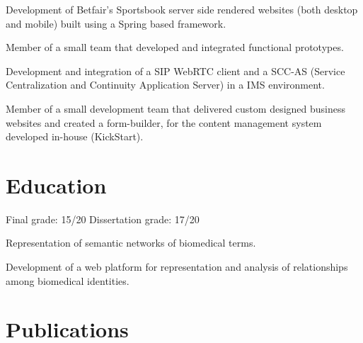 \documentclass[]{andre-vechina-resume}
\begin{document}
\vspace{\topsep} %
\begin{tightemize}
\item
Development of Betfair's Sportsbook server side rendered websites (both desktop and mobile) built using a Spring based framework.
\end{tightemize}
\sectionsep

\begin{tightemize}
\item
Member of a small team that developed and integrated functional prototypes.
\item
Development and integration of a SIP WebRTC client and a SCC-AS (Service Centralization and Continuity Application Server) in a IMS environment.
\end{tightemize}
\sectionsep

\begin{tightemize}
\item
Member of a small development team that delivered custom designed business websites and created a form-builder, for the content management system developed in-house (KickStart).
\end{tightemize}
\sectionsep

\section{Education}

Final grade: {\color{subheadings} 15/20}
\tdot
Dissertation grade: {\color{subheadings} 17/20}\\
\begin{tightemize}
\item
Representation of semantic networks of biomedical terms.
\item
Development of a web platform for representation and analysis of relationships among biomedical identities.
\end{tightemize}
\sectionsep

\section{Publications}



\nocite{*}
\end{document}
